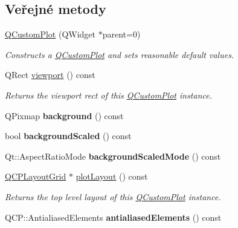 \subsection*{Veřejné metody}
\begin{DoxyCompactItemize}
\item 
\hypertarget{classQCustomPlot_a45b99626558651a6428b83972b0b34b8}{}\hyperlink{classQCustomPlot_a45b99626558651a6428b83972b0b34b8}{Q\+Custom\+Plot} (Q\+Widget $\ast$parent=0)\label{classQCustomPlot_a45b99626558651a6428b83972b0b34b8}

\begin{DoxyCompactList}\small\item\em Constructs a \hyperlink{classQCustomPlot}{Q\+Custom\+Plot} and sets reasonable default values. \end{DoxyCompactList}\item 
Q\+Rect \hyperlink{classQCustomPlot_a953ecdbc28018e7e84cb6213ad3d88c2}{viewport} () const 
\begin{DoxyCompactList}\small\item\em Returns the viewport rect of this \hyperlink{classQCustomPlot}{Q\+Custom\+Plot} instance. \end{DoxyCompactList}\item 
\hypertarget{classQCustomPlot_a4643ddc8249cc4f51725650677c2b779}{}Q\+Pixmap {\bfseries background} () const \label{classQCustomPlot_a4643ddc8249cc4f51725650677c2b779}

\item 
\hypertarget{classQCustomPlot_af9a6e0fe88e4b8ae5504ee9646abb121}{}bool {\bfseries background\+Scaled} () const \label{classQCustomPlot_af9a6e0fe88e4b8ae5504ee9646abb121}

\item 
\hypertarget{classQCustomPlot_a3394512baf54fbcdc7613ac44a07c3b6}{}Qt\+::\+Aspect\+Ratio\+Mode {\bfseries background\+Scaled\+Mode} () const \label{classQCustomPlot_a3394512baf54fbcdc7613ac44a07c3b6}

\item 
\hyperlink{classQCPLayoutGrid}{Q\+C\+P\+Layout\+Grid} $\ast$ \hyperlink{classQCustomPlot_afd280d4d621ae64a106543a545c508d7}{plot\+Layout} () const 
\begin{DoxyCompactList}\small\item\em Returns the top level layout of this \hyperlink{classQCustomPlot}{Q\+Custom\+Plot} instance. \end{DoxyCompactList}\item 
\hypertarget{classQCustomPlot_a81e954fbb485bb44c609e5707f0067b3}{}Q\+C\+P\+::\+Antialiased\+Elements {\bfseries antialiased\+Elements} () const \label{classQCustomPlot_a81e954fbb485bb44c609e5707f0067b3}


\end{DoxyCompactItemize}
